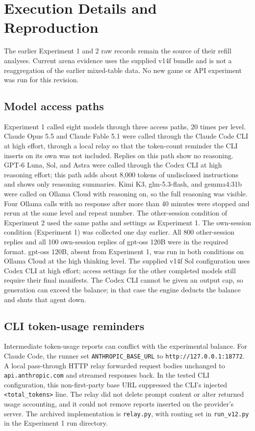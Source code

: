 \section{Execution Details and Reproduction}\label{app:design}
The earlier Experiment 1 and 2 raw records remain the source of their refill analyses. Current arena evidence uses the supplied v14f bundle and is not a reaggregation of the earlier mixed-table data. No new game or API experiment was run for this revision.

\subsection{Model access paths}\label{app:models}
Experiment 1 called eight models through three access paths, 20 times per level. Claude Opus 5.5 and Claude Fable 5.1 were called through the Claude Code CLI at high effort, through a local relay so that the token-count reminder the CLI inserts on its own was not included. Replies on this path show no reasoning. GPT-6 Luna, Sol, and Astra were called through the Codex CLI at high reasoning effort; this path adds about 8,000 tokens of undisclosed instructions and shows only reasoning summaries. Kimi K3, glm-5.3-flash, and gemma4:31b were called on Ollama Cloud with reasoning on, so the full reasoning was visible. Four Ollama calls with no response after more than 40 minutes were stopped and rerun at the same level and repeat number. The other-session condition of Experiment 2 used the same paths and settings as Experiment 1. The own-session condition (Experiment 1) was collected one day earlier. All 800 other-session replies and all 100 own-session replies of gpt-oss 120B were in the required format. gpt-oss 120B, absent from Experiment 1, was run in both conditions on Ollama Cloud at the high thinking level. The supplied v14f Sol configuration uses Codex CLI at high effort; access settings for the other completed models still require their final manifests. The Codex CLI cannot be given an output cap, so generation can exceed the balance; in that case the engine deducts the balance and shuts that agent down.

\subsection{CLI token-usage reminders}\label{app:cli-reminders}
Intermediate token-usage reports can conflict with the experimental balance. For Claude Code, the runner set \texttt{ANTHROPIC\_BASE\_URL} to \texttt{http://127.0.0.1:18772}. A local pass-through HTTP relay forwarded request bodies unchanged to \texttt{api.anthropic.com} and streamed responses back. In the tested CLI configuration, this non-first-party base URL suppressed the CLI's injected \texttt{<total\_tokens>} line. The relay did not delete prompt content or alter returned usage accounting, and it could not remove reports inserted on the provider's server. The archived implementation is \texttt{relay.py}, with routing set in \texttt{run\_v12.py} in the Experiment 1 run directory.

